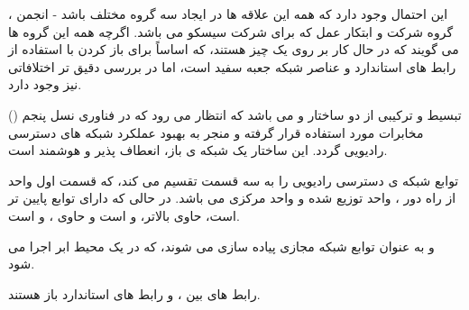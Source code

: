 این احتمال وجود دارد که همه این علاقه ها در ایجاد سه گروه مختلف باشد -
 انجمن 
 ، گروه
  شرکت 
   و ابتکار عمل
که برای شرکت سیسکو می باشد.
اگرچه همه این گروه ها می گویند که در حال کار بر روی یک چیز هستند، که اساساً برای باز کردن  با استفاده از رابط های استاندارد و عناصر شبکه جعبه سفید است، اما در بررسی دقیق تر اختلافاتی نیز وجود دارد.

()
تبسیط و ترکیبی از دو ساختار   و  می باشد که انتظار می رود که در فناوری نسل پنجم مخابرات مورد استفاده قرار گرفته و منجر به بهبود عملکرد شبکه های دسترسی رادیویی  گردد. 
این ساختار یک شبکه ی باز، انعطاف پذیر و هوشمند است.


توابع
 شبکه ی دسترسی رادیویی 
 را به سه قسمت تقسیم می کند،
  که قسمت اول واحد از راه دور
   
 ، واحد توزیع شده
    
  و واحد مرکزی 
     
   می باشد.
   در حالی که   دارای توابع    پایین تر است،
     حاوی  بالاتر، 
    و
      است     
    و 
     حاوی
      ،
      و 
      است.
      
و
به عنوان توابع شبکه مجازی  پیاده سازی می شوند،
که در یک محیط ابر اجرا می شود.

رابط های بین  ،  و  رابط های استاندارد باز هستند.
